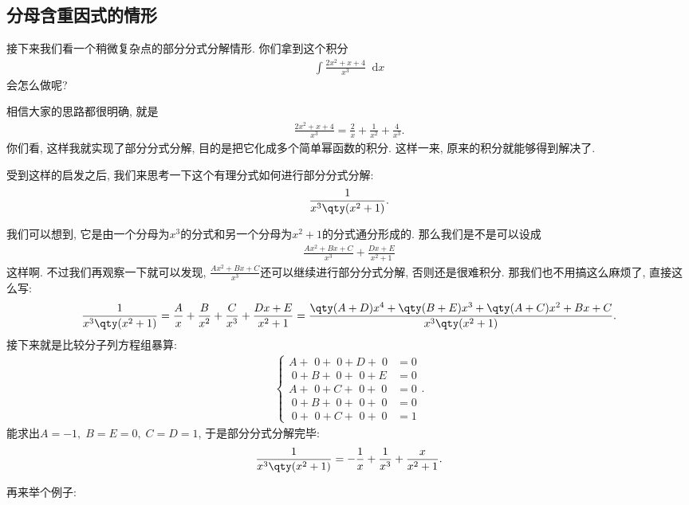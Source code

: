 \documentclass{ctexbook}
\newcommand*{\dif}{\mathop{}\!\mathrm{d}}
\begin{document}
{\subsection{分母含重因式的情形}
接下来我们看一个稍微复杂点的部分分式分解情形. 你们拿到这个积分
\begin{align*}
\int\frac{2x^{2}+x+4}{x^{3}}\dif{x}
\end{align*}
会怎么做呢? \par
相信大家的思路都很明确, 就是
\begin{align*}
\frac{2x^{2}+x+4}{x^{3}}=\frac{2}{x}+\frac{1}{x^{2}}+\frac{4}{x^{3}}
.\end{align*}
你们看, 这样我就实现了部分分式分解, 目的是把它化成多个简单幂函数的积分. 这样一来, 原来的积分就能够得到解决了. \par
受到这样的启发之后, 我们来思考一下这个有理分式如何进行部分分式分解: 
\begin{align*}
\frac{1}{x^{3}\qty(x^{2}+1)}
.\end{align*}\par
我们可以想到, 它是由一个分母为$x^{3}$的分式和另一个分母为$x^{2}+1$的分式通分形成的. 那么我们是不是可以设成
\begin{align*}
\frac{Ax^{2}+Bx+C}{x^{3}}+\frac{Dx+E}{x^{2}+1}
\end{align*}
这样啊. 不过我们再观察一下就可以发现, $\frac{Ax^{2}+Bx+C}{x^{3}}$还可以继续进行部分分式分解, 否则还是很难积分. 那我们也不用搞这么麻烦了, 直接这么写: 
\begin{align*}
\frac{1}{x^{3}\qty(x^{2}+1)}=\frac{A}{x}+\frac{B}{x^{2}}+\frac{C}{x^{3}}+\frac{Dx+E}{x^{2}+1}=\frac{\qty(A+D)x^{4}+\qty(B+E)x^{3}+\qty(A+C)x^{2}+Bx+C}{x^{3}\qty(x^{2}+1)}
.\end{align*}
接下来就是比较分子列方程组暴算: 
\begin{align*}
\begin{cases}
A+\,\,0+\;0+D+\;0&=0\\
\;0+B+\;0+\,\,0+E&=0\\
A+\,\,0+C+\,\,0+\;0&=0\\
\;0+B+\;0+\,\,0+\;0&=0\\
\;0+\,\,0+C+\,\,0+\;0&=1
\end{cases}
.\end{align*}
能求出$A=-1,\;B=E=0,\;C=D=1$, 于是部分分式分解完毕: 
\begin{align*}
\frac{1}{x^{3}\qty(x^{2}+1)}=-\frac{1}{x}+\frac{1}{x^{3}}+\frac{x}{x^{2}+1}
.\end{align*}\par
再来举个例子: 
\begin{align*}

\end{align*}}
\end{document}
